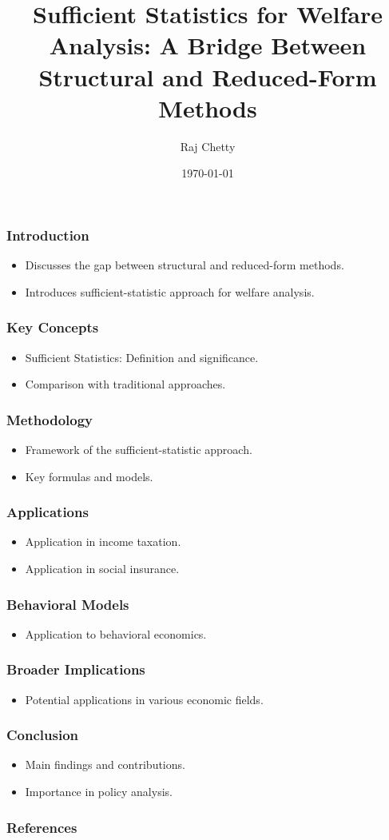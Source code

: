 \documentclass{beamer}
\title{Sufficient Statistics for Welfare Analysis: A Bridge Between Structural and Reduced-Form Methods}
\author{Raj Chetty}
\date{\today}
\begin{document}
\frame{\titlepage}

\begin{frame}
\frametitle{Introduction}
\begin{itemize}
    \item Discusses the gap between structural and reduced-form methods.
    \item Introduces sufficient-statistic approach for welfare analysis.
\end{itemize}
\end{frame}

\begin{frame}
\frametitle{Key Concepts}
\begin{itemize}
    \item Sufficient Statistics: Definition and significance.
    \item Comparison with traditional approaches.
\end{itemize}
\end{frame}

\begin{frame}
\frametitle{Methodology}
\begin{itemize}
    \item Framework of the sufficient-statistic approach.
    \item Key formulas and models.
\end{itemize}
\end{frame}

\begin{frame}
\frametitle{Applications}
\begin{itemize}
    \item Application in income taxation.
    \item Application in social insurance.
\end{itemize}
\end{frame}

\begin{frame}
\frametitle{Behavioral Models}
\begin{itemize}
    \item Application to behavioral economics.
\end{itemize}
\end{frame}

\begin{frame}
\frametitle{Broader Implications}
\begin{itemize}
    \item Potential applications in various economic fields.
\end{itemize}
\end{frame}

\begin{frame}
\frametitle{Conclusion}
\begin{itemize}
    \item Main findings and contributions.
    \item Importance in policy analysis.
\end{itemize}
\end{frame}

\begin{frame}
\frametitle{References}
\end{frame}
\end{document}
